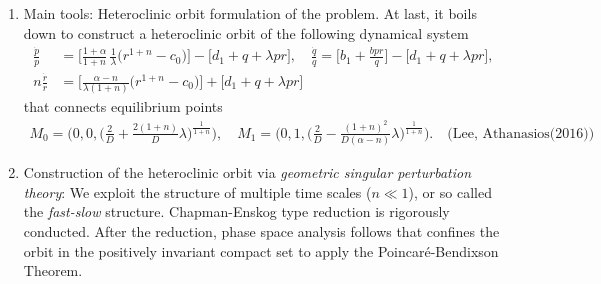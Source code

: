 \documentclass[a4paper,11pt]{article}
\def\dpp{\dot{p}}
\def\dqq{\dot{q}}
\def\drr{\dot{r}}
\begin{document}

\begin{enumerate}
 \item Main tools: Heteroclinic orbit formulation of the problem. At last, it boils down to construct a heteroclinic orbit of the following dynamical system
\begin{equation} \label{eq:pqrsys}\tag{P}
\begin{aligned}
 \frac{\dpp}{p}&=\Big[\frac{1+\alpha}{1+n}\,\frac{1}{\lambda }\Big(r^{1+n}-c_0\Big)\Big] -\Big[d_1 + q + \lambda pr\Big], \quad
 \frac{\dqq}{q}=\Big[b_1 +\frac{bpr}{q}\Big] -\Big[d_1 + q + \lambda pr\Big],\\
 n\frac{\drr}{r}&=\Big[\frac{\alpha-n}{\lambda(1+n)}\Big(r^{1+n}-c_0\Big)\Big]+\Big[d_1 + q + \lambda pr\Big]
\end{aligned}
\end{equation}
that connects equilibrium points
\begin{align*}
 M_0=\Big(0,0,\big(\frac{2}{D} + \frac{2(1+n)}{D} \lambda\big)^{\frac{1}{1+n}}\Big), \quad M_1=\Big(0,1,\big(\frac{2}{D} -\frac{(1+n)^2}{D(\alpha-n)} \lambda\big)^{\frac{1}{1+n}}\Big). \quad\text{(Lee, Athanasios(2016))}
\end{align*}
 \item Construction of the heteroclinic orbit via {\it geometric singular perturbation theory}: We exploit the structure of multiple time scales ($n\ll1$), or so called the {\it fast-slow} structure. Chapman-Enskog type reduction is rigorously conducted. After the reduction, phase space analysis follows that confines the orbit in the positively invariant compact set to apply the Poincar\'e-Bendixson Theorem.
\end{enumerate}
\end{document}

